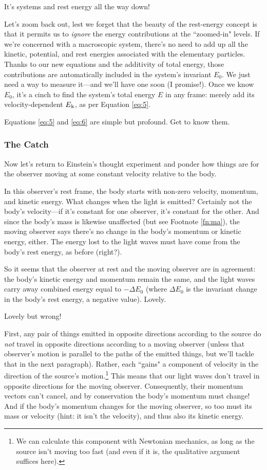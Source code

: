 \documentclass[12pt]{article}
\begin{document}
It's systems and rest energy all the way down!

Let's zoom back out, lest we forget that the beauty of the rest-energy concept is that it permits us to \emph{ignore} the energy contributions at the ``zoomed-in" levels. If we're concerned with a macroscopic system, there's no need to add up all the kinetic, potential, and rest energies associated with the elementary particles. Thanks to our new equations and the additivity of total energy, those contributions are automatically included in the system's invariant $E_0$. We just need a way to measure it---and we'll have one soon (I promise!). Once we know $E_0$, it's a cinch to find the system's total energy $E$ in any frame: merely add its velocity-dependent $E_{\mkern.5mu \textrm{k}}$, as per Equation \ref{eq:5}.

Equations \ref{eq:5} and \ref{eq:6} are simple but profound. Get to know them.

\subsubsection{The Catch}\label{sssec:tc}

Now let's return to Einstein's thought experiment and ponder how things are for the observer moving at some constant velocity relative to the body.

In this observer's rest frame, the body starts with non-zero velocity, momentum, and kinetic energy. What changes when the light is emitted? Certainly not the body's velocity---if it's constant for one observer, it's constant for the other. And since the body's mass is likewise unaffected (but see Footnote \ref{fn:ma}), the moving observer says there's no change in the body's momentum or kinetic energy, either. The energy lost to the light waves must have come from the body's rest energy, as before (right?).

So it seems that the observer at rest and the moving observer are in agreement: the body's kinetic energy and momentum remain the same, and the light waves carry away combined energy equal to $-\Delta E_0$ (where $\Delta E_0$ is the invariant change in the body's rest energy, a negative value). Lovely.

Lovely but wrong!

First, any pair of things emitted in opposite directions according to the source do \emph{not} travel in opposite directions according to a moving observer (unless that observer's motion is parallel to the paths of the emitted things, but we'll tackle that in the next paragraph). Rather, each ``gains" a component of velocity in the direction of the source's motion.\footnote{We can calculate this component with Newtonian mechanics, as long as the source isn't moving too fast (and even if it is, the qualitative argument suffices here).} This means that our light waves don't travel in opposite directions for the moving observer. Consequently, their momentum vectors can't cancel, and by conservation the body's momentum must change! And if the body's momentum changes for the moving observer, so too must its mass or velocity (hint: it isn't the velocity), and thus also its kinetic energy.
\end{document}
